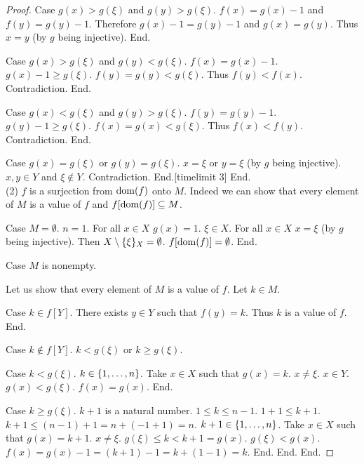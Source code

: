 \documentclass{article}
\begin{document}
\begin{forthel}
\begin{proof}
    Case $g(x) > g(\xi)$ and $g(y) > g(\xi)$. $f(x) = g(x) - 1$ and $f(y) = g(y) - 1$. Therefore $g(x) - 1 = g(y) - 1$ and 
      $g(x) = g(y)$. Thus $x = y$ (by $g$ being injective). End.
      
    Case $g(x) > g(\xi)$ and $g(y) < g(\xi)$. $f(x) = g(x) - 1$. $g(x) - 1 \geq g(\xi)$. $f(y) = g(y) < g(\xi)$. 
      Thus $f(y) < f(x)$. Contradiction. End.
      
    Case $g(x) < g(\xi)$ and $g(y) > g(\xi)$. $f(y) = g(y) - 1$. $g(y) - 1 \geq g(\xi)$. $f(x) = g(x) < g(\xi)$. 
      Thus $f(x) < f(y)$. Contradiction. End.
      
    Case $g(x) = g(\xi)$ or $g(y) = g(\xi)$. $x = \xi$ or $y = \xi$ (by $g$ being injective). $x,y \in Y$ and $\xi \notin Y$. 
      Contradiction. End.[timelimit 3]
  End.\\

  (2) $f$ is a surjection from $\operatorname{dom}(f)$ onto $M$.
  Indeed we can show that every element of $M$ is a value of $f$ and $f[\operatorname{dom}(f)] \subseteq M$. 

    Case $M = \emptyset$. $n = 1$. For all $x \in X$ $g(x) = 1$. $\xi \in X$. For all $x \in X$ $x = \xi$ (by $g$ being injective).
      Then $X \setminus \{\xi\}_{X} = \emptyset$. $f[\operatorname{dom}(f)] = \emptyset$. End.

    Case $M$ is nonempty.
      
      Let us show that every element of $M$ is a value of $f$.
        Let $k \in M$.

        Case $k \in f[Y]$. There exists $y \in Y$ such that $f(y) = k$. Thus $k$ is a value of $f$. End.
        
        Case $k \notin f[Y]$.
          $k < g(\xi)$ or $k \geq g(\xi)$. 
          
          Case $k < g(\xi)$. $k \in \{1,\dots,n\}$. Take $x \in X$ such that $g(x) = k$. $x \neq \xi$. $x \in Y$. $g(x) < g(\xi)$. 
            $f(x) = g(x)$. End.
          
          Case $k \geq g(\xi)$. $k+1$ is a natural number. $1 \leq k \leq n-1$. $1+1 \leq k+1 $. 
            $k+1 \leq (n-1) + 1 = n + (-1 + 1) = n$. 
            $k + 1 \in \{1,\dots,n\}$. Take $x \in X$ such that $g(x) = k + 1$. $x \neq \xi$. 
            $g(\xi) \leq k < k + 1 = g(x)$. $g(\xi) < g(x)$.
            $f(x) = g(x) - 1 = (k + 1) - 1 = k + (1 - 1) = k$. End.
        End.
      End.


\end{proof}
\end{forthel}
\end{document}
